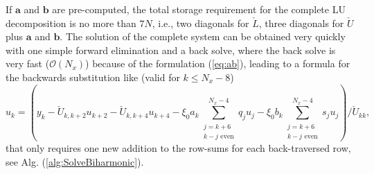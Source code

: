 \documentclass[11pt, oneside]{elsarticle}
\newcommand{\N}[1]{\check{#1}}
\begin{document}
If $\bm{a}$ and $\bm{b}$ 
are pre-computed, 
the total storage requirement for the complete LU decomposition is no more than 
$7N$, i.e., two diagonals for $\N{L}$, three diagonals for $\N{U}$ plus 
$\bm{a}$ and 
$\bm{b}$. The solution of the complete system can be obtained very quickly with 
one simple forward elimination and a back solve, where the back 
solve is very fast ($\mathcal{O}(N_x)$) because of the formulation (\ref{eq:ab}), leading 
to a formula for the backwards substitution like (valid for $k \le N_x-8$)
\begin{equation}
u_k = \left(y_k - \N{U}_{k, k+2} u_{k+2} - \N{U}_{k, k+4} u_{k+4} - 
\xi_0 a_k\sum_{\substack{j=k+6\\k-j \text{ even}}}^{N_x-4} q_j u_j - 
\xi_0 b_k\sum_{\substack{j=k+6\\k-j \text{ even}}}^{N_x-4} 
s_j u_j\right)/\N{U}_{kk},
\end{equation}
that only requires 
one new addition to the row-sums for each back-traversed
row, see Alg. (\ref{alg:SolveBiharmonic}).
\end{document}
